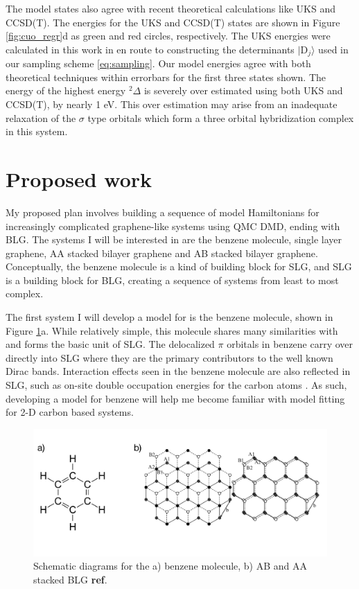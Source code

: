 \documentclass[12pt]{article}
\begin{document}
The model states also agree with recent theoretical calculations like UKS and CCSD(T).
The energies for the UKS and CCSD(T) \cite{Xian2000} states are shown in Figure \ref{fig:cuo_regr}d as green and red circles, respectively.
The UKS energies were calculated in this work in en route to constructing the determinants $|\text{D}_j\rangle$ used in our sampling scheme \eqref{eq:sampling}.
Our model energies agree with both theoretical techniques within errorbars for the first three states shown.
The energy of the highest energy $^2\Delta$ is severely over estimated using both UKS and CCSD(T), by nearly 1 eV.
This over estimation may arise from an inadequate relaxation of the $\sigma$ type orbitals which form a three orbital hybridization complex in this system.

\section{Proposed work}
My proposed plan involves building a sequence of model Hamiltonians for increasingly complicated graphene-like systems using QMC DMD, ending with BLG.
The systems I will be interested in are the benzene molecule, single layer graphene, AA stacked bilayer graphene and AB stacked bilayer graphene.
Conceptually, the benzene molecule is a kind of building block for SLG, and SLG is a building block for BLG, creating a sequence of systems from least to most complex.

The first system I will develop a model for is the benzene molecule, shown in Figure \ref{fig:proposed}a.
While relatively simple, this molecule shares many similarities with and forms the basic unit of SLG.
The delocalized $\pi$ orbitals in benzene carry over directly into SLG where they are the primary contributors to the well known Dirac bands.
Interaction effects seen in the benzene molecule are also reflected in SLG, such as on-site double occupation energies for the carbon atoms \cite{Zheng2017, Wagner2015}.
As such, developing a model for benzene will help me become familiar with model fitting for 2-D carbon based systems.

\begin{figure}
\centering
\includegraphics[width=1.0\linewidth]{./figs/proposed.pdf}
\caption{Schematic diagrams for the a) benzene molecule, b) AB and AA stacked BLG \textbf{ref}.}
\label{fig:proposed}
\end{figure}
\end{document}
